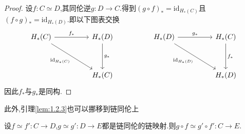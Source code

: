 \documentclass{article}
\begin{document}
\begin{proof}
    设$f :C \simeq D$,其同伦逆$g : D \to C$.得到$(g \circ f)_* = \text{id}_{H_*(C)}$且$(f \circ g)_* = \text{id}_{H_*(D)}$.即以下图表交换
    \[\begin{tikzcd}
        {H_*(C)} && {H_*(D)} && {H_*(D)} && {H_*(C)} \\
        \\
        && {H_*(C)} &&&& {H_*(D)}
        \arrow["{f_*}", from=1-1, to=1-3]
        \arrow["{g_*}", from=1-3, to=3-3]
        \arrow["{g_*}", from=1-5, to=1-7]
        \arrow["{f_*}", from=1-7, to=3-7]
        \arrow["{\text{id}_{H_*(D)}}"', from=1-5, to=3-7]
        \arrow["{\text{id}_{H_*(C)}}"', from=1-1, to=3-3]
    \end{tikzcd}\]
    因此$f_*$与$g_*$是同构.
\end{proof}
此外,引理\ref{lem:1.2.3}也可以挪移到链同伦上
\begin{proposition}
    设$f \simeq f' : C \to D$,$g \simeq g' : D \to E$都是链同伦的链映射.则$g \circ f \simeq g' \circ f': C\to E$.
\end{proposition}
\end{document}
